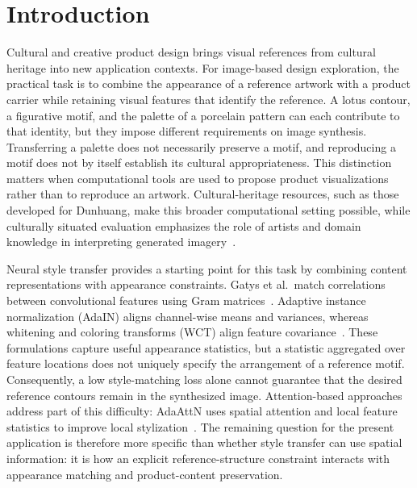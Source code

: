 \documentclass[manuscript,acmlarge,screen,review]{acmart}
\begin{document}
\section{Introduction}

Cultural and creative product design brings visual references from cultural heritage into new application contexts. For image-based design exploration, the practical task is to combine the appearance of a reference artwork with a product carrier while retaining visual features that identify the reference. A lotus contour, a figurative motif, and the palette of a porcelain pattern can each contribute to that identity, but they impose different requirements on image synthesis. Transferring a palette does not necessarily preserve a motif, and reproducing a motif does not by itself establish its cultural appropriateness. This distinction matters when computational tools are used to propose product visualizations rather than to reproduce an artwork. Cultural-heritage resources, such as those developed for Dunhuang, make this broader computational setting possible, while culturally situated evaluation emphasizes the role of artists and domain knowledge in interpreting generated imagery~\cite{yu2022,qadri2024}.

Neural style transfer provides a starting point for this task by combining content representations with appearance constraints. Gatys et al.\ match correlations between convolutional features using Gram matrices~\cite{gatys2016}. Adaptive instance normalization (AdaIN) aligns channel-wise means and variances, whereas whitening and coloring transforms (WCT) align feature covariance~\cite{huang2017,li2017}. These formulations capture useful appearance statistics, but a statistic aggregated over feature locations does not uniquely specify the arrangement of a reference motif. Consequently, a low style-matching loss alone cannot guarantee that the desired reference contours remain in the synthesized image. Attention-based approaches address part of this difficulty: AdaAttN uses spatial attention and local feature statistics to improve local stylization~\cite{liu2021}. The remaining question for the present application is therefore more specific than whether style transfer can use spatial information: it is how an explicit reference-structure constraint interacts with appearance matching and product-content preservation.
\end{document}

